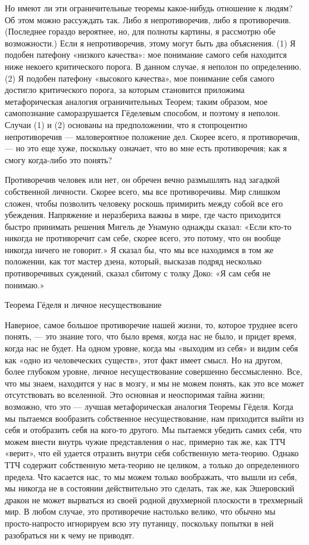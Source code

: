 Но имеют ли эти ограничительные теоремы какое-нибудь отношение к людям? Об этом можно рассуждать так. Либо я непротиворечив, либо я противоречив. (Последнее гораздо вероятнее, но, для полноты картины, я рассмотрю обе возможности.) Если я непротиворечив, этому могут быть два объяснения. (1) Я подобен патефону «низкого качества»: мое понимание самого себя находится ниже некоего критического порога. В данном случае, я неполон по определению. (2) Я подобен патефону «высокого качества», мое понимание себя самого достигло критического порога, за которым становится приложима метафорическая аналогия ограничительных Теорем; таким образом, мое самопознание саморазрушается Гёделевым способом, и поэтому я неполон. Случаи (1) и (2) основаны на предположении, что я стопроцентно непротиворечив --- маловероятное положение дел. Скорее всего, я противоречив, --- но это еще хуже, поскольку означает, что во мне есть противоречия; как я смогу когда-либо это понять?

Противоречив человек или нет, он обречен вечно размышлять над загадкой собственной личности. Скорее всего, мы все противоречивы. Мир слишком сложен, чтобы позволить человеку роскошь примирить между собой все его убеждения. Напряжение и неразбериха важны в мире, где часто приходится быстро принимать решения Мигель де Унамуно однажды сказал: «Если кто-то никогда не противоречит сам себе, скорее всего, это потому, что он вообще никогда ничего не говорит.» Я сказал бы, что мы все находимся в том же положении, как тот мастер дзена, который, высказав подряд несколько противоречивых суждений, сказал сбитому с толку Доко: «Я сам себя не понимаю.»

Теорема Гёделя и личное несуществование

Наверное, самое большое противоречие нашей жизни, то, которое труднее всего понять, --- это знание того, что было время, когда нас не было, и придет время, когда нас не будет. На одном уровне, когда мы «выходим из себя» и видим себя как «одно из человеческих существ», этот факт имеет смысл. Но на другом, более глубоком уровне, личное несуществование совершенно бессмысленно. Все, что мы знаем, находится у нас в мозгу, и мы не можем понять, как это все может отсутствовать во вселенной. Это основная и неоспоримая тайна жизни; возможно, что это --- лучшая метафорическая аналогия Теоремы Гёделя. Когда мы пытаемся вообразить собственное несуществование, нам приходится выйти из себя и отобразить себя на кого-то другого. Мы пытаемся убедить самих себя, что можем внести внутрь чужие представления о нас, примерно так же, как ТТЧ «верит», что ей удается отразить внутри себя собственную мета-теорию. Однако ТТЧ содержит собственную мета-теорию не целиком, а только до определенного предела. Что касается нас, то мы можем только воображать, что вышли из себя, мы никогда не в состоянии действительно это сделать, так же, как Эшеровский дракон не может вырваться из своей родной двухмерной плоскости в трехмерный мир. В любом случае, это противоречие настолько велико, что обычно мы просто-напросто игнорируем всю эту путаницу, поскольку попытки в ней разобраться ни к чему не приводят.

